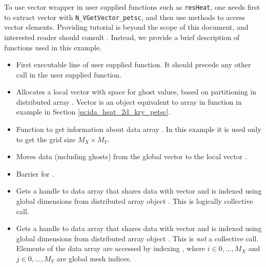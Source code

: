To use {\petsc} vector wrapper in user supplied functions such as 
\verb|resHeat|, one needs first to extract {\petsc} vector with 
\verb|N_VGetVector_petsc|, and then use {\petsc} methods to access 
vector elements. Providing {\petsc} tutorial is beyond the scope of 
this document, and interested reader should consult \cite{petsc-user-ref}. 
Instead, we provide a brief description of functions used in this example.
\begin{itemize}
\item {}
  \par First executable line of user supplied {\petsc} function. It should 
  precede any other {\petsc} call in the user supplied function.
  
\item {}
  \par Allocates a local vector  with space for ghost values, based 
  on partitioning in distributed array . Vector  is an object 
  equivalent to array  in function  in example
  in Section \ref{ss:ida_heat_2d_kry_petsc}.
  
\item {}
  \par Function to get information about data array . In this example
  it is used only to get the grid size $M_X \times M_Y$.
  
\item {}
  \par Moves data (including ghosts) from the global vector  to the 
  local vector . 
  
\item {}
  \par Barrier for .
  
\item {}
  \par Gets a handle to data array  that shares data with vector  and
  is indexed using global dimensions from distributed array object . This is 
  logically collective call.
  
\item {}
  \par Gets a handle to data array  that shares data with vector  and
  is indexed using global dimensions from distributed array object . 
  This is \emph{not} a collective call. Elements of the data array  are 
  accessed by indexing , where $i \in {0,\ldots,M_X}$ and 
  $j \in {0,\ldots,M_Y}$ are global mesh indices.
  

\end{itemize}
